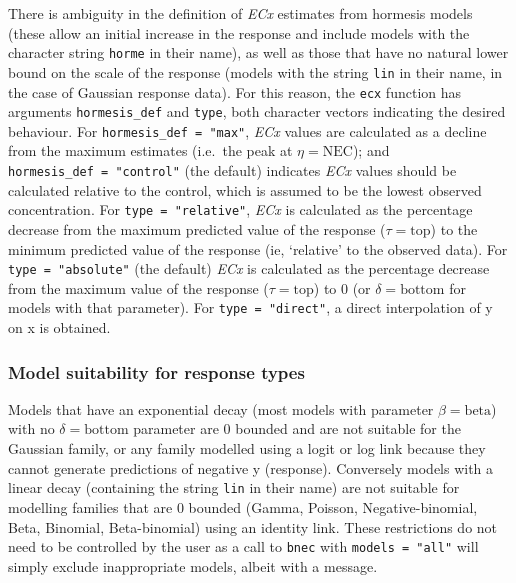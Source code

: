 \documentclass[
]{jss}
\begin{document}
There is ambiguity in the definition of \emph{ECx} estimates from
hormesis models (these allow an initial increase in the response
\citep[see][]{Mattson2008} and include models with the character string
\texttt{horme} in their name), as well as those that have no natural
lower bound on the scale of the response (models with the string
\texttt{lin} in their name, in the case of Gaussian response data). For
this reason, the \texttt{ecx} function has arguments
\texttt{hormesis\_def} and \texttt{type}, both character vectors
indicating the desired behaviour. For \texttt{hormesis\_def\ =\ "max"},
\emph{ECx} values are calculated as a decline from the maximum estimates
(i.e.~the peak at \(\eta = \text{NEC}\)); and
\texttt{hormesis\_def\ =\ "control"} (the default) indicates \emph{ECx}
values should be calculated relative to the control, which is assumed to
be the lowest observed concentration. For \texttt{type\ =\ "relative"},
\emph{ECx} is calculated as the percentage decrease from the maximum
predicted value of the response (\(\tau = \text{top}\)) to the minimum
predicted value of the response (ie, `relative' to the observed data).
For \texttt{type\ =\ "absolute"} (the default) \emph{ECx} is calculated
as the percentage decrease from the maximum value of the response
(\(\tau = \text{top}\)) to 0 (or \(\delta = \text{bottom}\) for models
with that parameter). For \texttt{type\ =\ "direct"}, a direct
interpolation of y on x is obtained.

\hypertarget{model-suitability-for-response-types}{%
\subsubsection{Model suitability for response
types}\label{model-suitability-for-response-types}}

Models that have an exponential decay (most models with parameter
\(\beta = \text{beta}\)) with no \(\delta = \text{bottom}\) parameter
are 0 bounded and are not suitable for the Gaussian family, or any
family modelled using a logit or log link because they cannot generate
predictions of negative y (response). Conversely models with a linear
decay (containing the string \texttt{lin} in their name) are not
suitable for modelling families that are 0 bounded (Gamma, Poisson,
Negative-binomial, Beta, Binomial, Beta-binomial) using an identity
link. These restrictions do not need to be controlled by the user as a
call to \texttt{bnec} with \texttt{models\ =\ "all"} will simply exclude
inappropriate models, albeit with a message.
\end{document}
